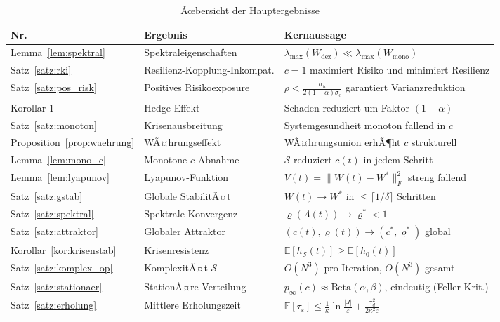 ﻿\documentclass[a4paper,12pt]{article}
\theoremstyle{definition}
\begin{document}
\begin{table}[H]
\centering
\caption{Ãœbersicht der Hauptergebnisse}
\begin{tabular}{llp{7.0cm}}
\toprule
\textbf{Nr.} & \textbf{Ergebnis} & \textbf{Kernaussage} \\
\midrule
Lemma~\ref{lem:spektral}    & Spektraleigenschaften   & $\lambda_{\max}(W_{\text{dez}}) \ll \lambda_{\max}(W_{\text{mono}})$ \\
Satz~\ref{satz:rki}         & Resilienz-Kopplung-Inkompat. & $c=1$ maximiert Risiko und minimiert Resilienz \\
Satz~\ref{satz:pos_risk}    & Positives Risikoexposure & $\rho < \frac{\sigma_h}{2(1-\alpha)\sigma_e}$ garantiert Varianzreduktion \\
Korollar 1                  & Hedge-Effekt            & Schaden reduziert um Faktor $(1-\alpha)$ \\
Satz~\ref{satz:monoton}     & Krisenausbreitung       & Systemgesundheit monoton fallend in $c$ \\
Proposition~\ref{prop:waehrung} & WÃ¤hrungseffekt      & WÃ¤hrungsunion erhÃ¶ht $c$ strukturell \\
\midrule
Lemma~\ref{lem:mono_c}      & Monotone $c$-Abnahme    & $\mathcal{S}$ reduziert $c(t)$ in jedem Schritt \\
Lemma~\ref{lem:lyapunov}    & Lyapunov-Funktion       & $V(t)=\|W(t)-W^*\|_F^2$ streng fallend \\
Satz~\ref{satz:gstab}       & Globale StabilitÃ¤t      & $W(t)\to W^*$ in $\leq\lceil 1/\delta\rceil$ Schritten \\
Satz~\ref{satz:spektral}    & Spektrale Konvergenz    & $\varrho(\Lambda(t))\to\varrho^*<1$ \\
Satz~\ref{satz:attraktor}   & Globaler Attraktor      & $(c(t),\varrho(t))\to(c^*,\varrho^*)$ global \\
Korollar~\ref{kor:krisenstab} & Krisenresistenz       & $\mathbb{E}[h_{\mathcal{S}}(t)]\geq\mathbb{E}[h_0(t)]$ \\
Satz~\ref{satz:komplex_op}  & KomplexitÃ¤t $\mathcal{S}$ & $O(N^3)$ pro Iteration, $O(N^3)$ gesamt \\
\midrule
Satz~\ref{satz:stationaer}  & StationÃ¤re Verteilung     & $p_\infty(c)\approx\mathrm{Beta}(\alpha,\beta)$, eindeutig (Feller-Krit.) \\
Satz~\ref{satz:erholung}    & Mittlere Erholungszeit    & $\mathbb{E}[\tau_\varepsilon]\leq\frac{1}{\kappa}\ln\frac{|J|}{\varepsilon}+\frac{\sigma_d^2}{2\kappa^2\varepsilon}$ \\

\end{tabular}
\end{table}
\end{document}
